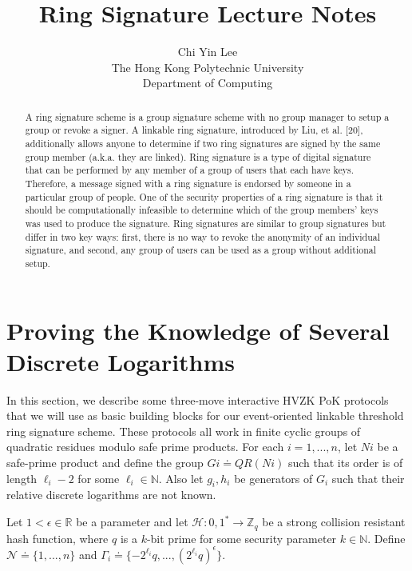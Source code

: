 \documentclass[11pt]{article}
\begin{document}
\title{Ring Signature Lecture Notes}
\author{Chi Yin Lee\\
The Hong Kong Polytechnic University\\
Department of Computing}
\renewcommand{\today}{June 20, 2019}

\maketitle
\begin{abstract}
   A ring signature scheme is a group signature scheme with
no group manager to setup a group or revoke a signer. A linkable ring
signature, introduced by Liu, et al. [20], additionally allows anyone to
determine if two ring signatures are signed by the same group member
(a.k.a. they are linked). Ring signature is a type of digital signature that can be performed by any member of a group of users that each have keys. Therefore, a message signed with a ring signature is endorsed by someone in a particular group of people. One of the security properties of a ring signature is that it should be computationally infeasible to determine which of the group members' keys was used to produce the signature. Ring signatures are similar to group signatures but differ in two key ways: first, there is no way to revoke the anonymity of an individual signature, and second, any group of users can be used as a group without additional setup.
\end{abstract}

\section{Proving the Knowledge of Several Discrete Logarithms}
In this section, we describe some three-move interactive HVZK PoK protocols
that we will use as basic building blocks for our event-oriented linkable threshold ring signature scheme. 
These protocols all work in finite cyclic groups of quadratic residues modulo safe prime products. 
For each $i = 1, . . . , n$, let $Ni$ be a safe-prime product and define the group $Gi \doteq QR(Ni)$ such that its order is of length $\ell_i - 2$ for some $\ell_i \in \mathbb{N}$. Also let $g_i, h_i$ be generators of $G_i$ such that their relative discrete logarithms are not known.

Let $1 < \epsilon  \in \mathbb{R}$ be a parameter and let $\mathcal{H} : {0,1}^* \rightarrow \mathbb{Z}_q$ be a strong collision resistant hash function, where $q$ is a $k$-bit prime for some security parameter $k \in \mathbb{N}$. Define $\mathcal{N} \doteq \{1,...,n\}$ and $\Gamma_i \doteq \{-2^{\ell_i}q,...,(2^{\ell_i}q)^\epsilon\}$.
\end{document}
